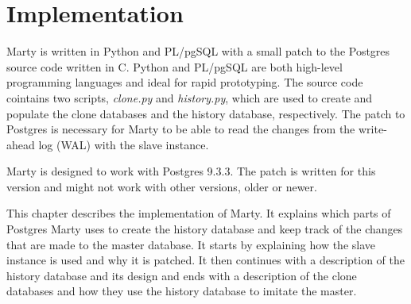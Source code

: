 \chapter{Implementation}
Marty is written in Python and PL/pgSQL with a small patch to the Postgres source code written in C.
Python and PL/pgSQL are both high-level programming languages and ideal for rapid prototyping.
The source code cointains two scripts, \textit{clone.py} and \textit{history.py}, which are used to create and populate the clone databases and the history database, respectively.
The patch to Postgres is necessary for Marty to be able to read the changes from the write-ahead log (WAL) with the slave instance.

Marty is designed to work with Postgres 9.3.3.
The patch is written for this version and might not work with other versions, older or newer.

This chapter describes the implementation of Marty.
It explains which parts of Postgres Marty uses to create the history database and keep track of the changes that are made to the master database.
It starts by explaining how the slave instance is used and why it is patched.
It then continues with a description of the history database and its design and ends with a description of the clone databases and how they use the history database to imitate the master.

